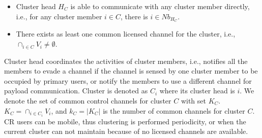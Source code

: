 \documentclass[journal,comsoc]{IEEEtran}
\theoremstyle{mytheoremstyle}
\theoremstyle{mytheoremstyle}
\theoremstyle{mytheoremstyle}
\newcommand{\ie}{i.e., }
\begin{document}
\begin{itemize}
\item Cluster head $H_C$ is able to communicate with any cluster member directly, \ie for any cluster member $i\in C$, there is $i\in Nb_{H_C}$.
\item There exists as least one common licensed channel for the cluster, \ie $\cap_{i\in C} V_i \neq \emptyset$.
\end{itemize}
Cluster head coordinates the activities of cluster members, \ie notifies all the members to evade a channel if the channel is sensed by one cluster member to be occupied by primary users, or notify the members to use a different channel for payload communication. 
Cluster is denoted as $C_i$ where its cluster head is $i$.
We denote the set of common control channels for cluster $C$ with set $K_C$.
$ K_C = \cap_{i\in C_i} V_i$, and $k_C = |K_C|$ is the number of common channels for cluster $C$.
CR users can be mobile, thus clustering is performed periodicity, or when the current cluster can not maintain because of no licensed channels are available.








\end{document}
